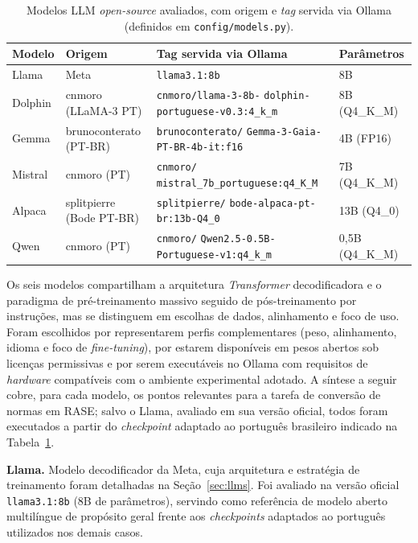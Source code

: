 \begin{table}[ht]
\centering
\caption{Modelos LLM \textit{open-source} avaliados, com origem e \textit{tag} servida via Ollama (definidos em \texttt{config/models.py}).}
\label{tab:modelos_llm}
\footnotesize
\setlength{\tabcolsep}{4pt}
\begin{tabular}{@{}l l >{\raggedright\arraybackslash}p{6.5cm} l@{}}
\hline
Modelo & Origem & Tag servida via Ollama & Parâmetros \\
\hline
Llama   & Meta                     & \texttt{llama3.1:8b}                                & 8B \\
Dolphin & cnmoro (LLaMA-3 PT)      & \texttt{cnmoro/llama-3-8b-} \texttt{dolphin-portuguese-v0.3:4\_k\_m} & 8B (Q4\_K\_M) \\
Gemma   & brunoconterato (PT-BR)   & \texttt{brunoconterato/} \texttt{Gemma-3-Gaia-PT-BR-4b-it:f16}      & 4B (FP16) \\
Mistral & cnmoro (PT)              & \texttt{cnmoro/} \texttt{mistral\_7b\_portuguese:q4\_K\_M}          & 7B (Q4\_K\_M) \\
Alpaca  & splitpierre (Bode PT-BR) & \texttt{splitpierre/} \texttt{bode-alpaca-pt-br:13b-Q4\_0}          & 13B (Q4\_0) \\
Qwen    & cnmoro (PT)              & \texttt{cnmoro/} \texttt{Qwen2.5-0.5B-Portuguese-v1:q4\_k\_m}       & 0,5B (Q4\_K\_M) \\
\hline
\end{tabular}
\end{table}

Os seis modelos compartilham a arquitetura \textit{Transformer} decodificadora e o paradigma de pré-treinamento massivo seguido de pós-treinamento por instruções, mas se distinguem em escolhas de dados, alinhamento e foco de uso. Foram escolhidos por representarem perfis complementares (peso, alinhamento, idioma e foco de \textit{fine-tuning}), por estarem disponíveis em pesos abertos sob licenças permissivas e por serem executáveis no Ollama com requisitos de \textit{hardware} compatíveis com o ambiente experimental adotado. A síntese a seguir cobre, para cada modelo, os pontos relevantes para a tarefa de conversão de normas em RASE; salvo o Llama, avaliado em sua versão oficial, todos foram executados a partir do \textit{checkpoint} adaptado ao português brasileiro indicado na Tabela~\ref{tab:modelos_llm}.

\textbf{Llama.} Modelo decodificador da Meta, cuja arquitetura e estratégia de treinamento foram detalhadas na Seção~\ref{sec:llms}. Foi avaliado na versão oficial \texttt{llama3.1:8b} (8B de parâmetros), servindo como referência de modelo aberto multilíngue de propósito geral frente aos \textit{checkpoints} adaptados ao português utilizados nos demais casos.

